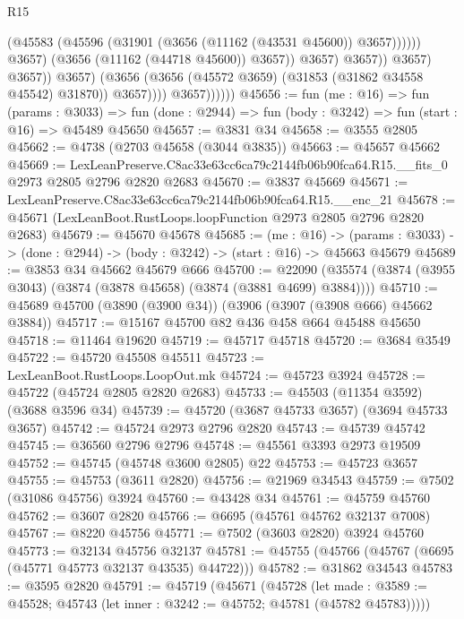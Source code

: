 \begin{lexlean}{R15}
\begin{coremodule}
                                            (@45583
                                              (@45596
                                                (@31901 (@3656 (@11162 (@43531 @45600)) @3657))))))
                                        @3657)
                                      (@3656 (@11162 (@44718 @45600)) @3657))
                                    @3657)
                                  @3657))
                              @3657)
                            @3657))
                        @3657)
                      (@3656 (@3656 (@45572 @3659) (@31853 (@31862 @34558 @45542) @31870)) @3657))))
                @3657))))))
@45656 := fun (me : @16) =>
  fun (params : @3033) =>
  fun (done : @2944) => fun (body : @3242) => fun (start : @16) => @45489 @45650
@45657 := @3831 @34
@45658 := @3555 @2805
@45662 := @4738 (@2703 @45658 (@3044 @3835))
@45663 := @45657 @45662
@45669 := LexLeanPreserve.C8ac33e63cc6ca79c2144fb06b90fca64.R15.__fits_0
    @2973
    @2805
    @2796
    @2820
    @2683
@45670 := @3837 @45669
@45671 := LexLeanPreserve.C8ac33e63cc6ca79c2144fb06b90fca64.R15.__enc_21
@45678 := @45671 (LexLeanBoot.RustLoops.loopFunction @2973 @2805 @2796 @2820 @2683)
@45679 := @45670 @45678
@45685 := (me : @16) ->
  (params : @3033) -> (done : @2944) -> (body : @3242) -> (start : @16) -> @45663 @45679
@45689 := @3853 @34 @45662 @45679 @666
@45700 := @22090 (@35574 (@3874 (@3955 @3043) (@3874 (@3878 @45658) (@3874 (@3881 @4699) @3884))))
@45710 := @45689 @45700 (@3890 (@3900 @34)) (@3906 (@3907 (@3908 @666) @45662 @3884))
@45717 := @15167 @45700 @82 @436 @458 @664 @45488 @45650
@45718 := @11464 @19620
@45719 := @45717 @45718
@45720 := @3684 @3549
@45722 := @45720 @45508 @45511
@45723 := LexLeanBoot.RustLoops.LoopOut.mk
@45724 := @45723 @3924
@45728 := @45722 (@45724 @2805 @2820 @2683)
@45733 := @45503 (@11354 @3592) (@3688 @3596 @34)
@45739 := @45720 (@3687 @45733 @3657) (@3694 @45733 @3657)
@45742 := @45724 @2973 @2796 @2820
@45743 := @45739 @45742
@45745 := @36560 @2796 @2796
@45748 := @45561 @3393 @2973 @19509
@45752 := @45745 (@45748 @3600 @2805) @22
@45753 := @45723 @3657
@45755 := @45753 (@3611 @2820)
@45756 := @21969 @34543
@45759 := @7502 (@31086 @45756) @3924
@45760 := @43428 @34
@45761 := @45759 @45760
@45762 := @3607 @2820
@45766 := @6695 (@45761 @45762 @32137 @7008)
@45767 := @8220 @45756
@45771 := @7502 (@3603 @2820) @3924 @45760
@45773 := @32134 @45756 @32137
@45781 := @45755 (@45766 (@45767 (@6695 (@45771 @45773 @32137 @43535) @44722)))
@45782 := @31862 @34543
@45783 := @3595 @2820
@45791 := @45719
    (@45671
      (@45728
        (let made : @3589 := @45528; @45743 (let inner : @3242 := @45752; @45781 (@45782 @45783)))))

\end{coremodule}
\end{lexlean}
